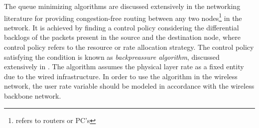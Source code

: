 
The queue minimizing algorithms are discussed extensively in the networking literature for providing congestion-free routing between any two nodes\footnote{refers to routers or PC's} in the network. It is achieved by finding a control policy considering the differential backlogs of the packets present in the source and the destination node, where control policy refers to the resource or rate allocation strategy. The control policy satisfying the condition is known as \emph{backpreassure algorithm}, discussed extensively in \cite{tassiulas,georgiadis2006resource,neely2010stochastic}. The algorithm assumes the physical layer rate as a fixed entity due to the wired infrastructure. In order to use the algorithm in the wireless network, the user rate variable  should be modeled in accordance with the wireless backbone network.

